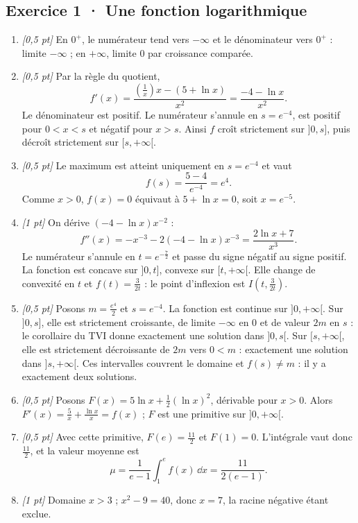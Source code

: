 \subsection*{Exercice 1 · Une fonction logarithmique}\begin{enumerate}

\item \textit{[0,5 pt]} En $0^+$, le numérateur tend vers $-\infty$ et le dénominateur vers $0^+$ : limite $-\infty$ ; en $+\infty$, limite $0$ par croissance comparée.

\item \textit{[0,5 pt]} Par la règle du quotient,
\[f'(x)=\frac{(\frac{1}{x})x-(5+\ln x)}{x^2}=\frac{-4-\ln x}{x^2}.\]
Le dénominateur est positif. Le numérateur s'annule en $s=e^{-4}$, est positif pour $0<x<s$ et négatif pour $x>s$. Ainsi $f$ croît strictement sur $]0,s]$, puis décroît strictement sur $[s,+\infty[$.

\item \textit{[0,5 pt]} Le maximum est atteint uniquement en $s=e^{-4}$ et vaut
\[f(s)=\frac{5- 4}{e^{-4}}=e^{4}.\]
Comme $x>0$, $f(x)=0$ équivaut à $5+\ln x=0$, soit $x=e^{-5}$.

\item \textit{[1 pt]} On dérive $(-4-\ln x)x^{-2}$ :
\[f''(x)=-x^{-3}-2(-4-\ln x)x^{-3}=\frac{2\ln x+7}{x^3}.\]
Le numérateur s'annule en $t=e^{-\frac{7}{2}}$ et passe du signe négatif au signe positif. La fonction est concave sur $]0,t]$, convexe sur $[t,+\infty[$. Elle change de convexité en $t$ et $f(t)=\frac{3}{2t}$ : le point d'inflexion est $I(t,\frac{3}{2t})$.

\item \textit{[0,5 pt]} Posons $m=\frac{e^{4}}{2}$ et $s=e^{-4}$. La fonction est continue sur $]0,+\infty[$. Sur $]0,s]$, elle est strictement croissante, de limite $-\infty$ en $0$ et de valeur $2m$ en $s$ : le corollaire du TVI donne exactement une solution dans $]0,s[$. Sur $[s,+\infty[$, elle est strictement décroissante de $2m$ vers $0<m$ : exactement une solution dans $]s,+\infty[$. Ces intervalles couvrent le domaine et $f(s)\ne m$ : il y a exactement deux solutions.

\item \textit{[0,5 pt]} Posons $F(x)=5\ln x+\frac12(\ln x)^2$, dérivable pour $x>0$. Alors $F'(x)=\frac{5}{x}+\frac{\ln x}{x}=f(x)$ ; $F$ est une primitive sur $]0,+\infty[$.

\item \textit{[0,5 pt]} Avec cette primitive, $F(e)=\frac{11}{2}$ et $F(1)=0$. L'intégrale vaut donc $\frac{11}{2}$, et la valeur moyenne est
\[\mu=\frac{1}{e-1}\int_1^e f(x)\,\dd x=\frac{11}{2(e-1)}.\]

\item \textit{[1 pt]} Domaine $x>3$ ; $x^2-9=40$, donc $x=7$, la racine négative étant exclue.

\end{enumerate}

